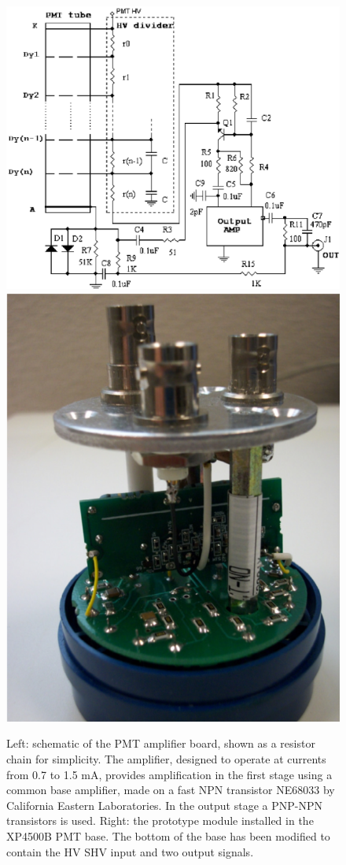 \begin{figure}
	\centering
	\includegraphics[width=1.25\columnwidth, keepaspectratio]{img/dividerSchematic.png}
	\includegraphics[width=0.75\columnwidth, height=0.95\columnwidth]{img/pmtWithDivider.png}
	\caption{Left: schematic of the PMT amplifier board, shown as a resistor chain for simplicity.
             The amplifier, designed to operate at currents from 0.7 to 1.5 mA, provides amplification in the first stage
			 using a common base amplifier, made on a fast NPN transistor NE68033 by California Eastern Laboratories.
			 In the output stage a PNP-NPN transistors is used.
             Right: the prototype module installed in the XP4500B PMT base.
             The bottom of the base has been modified to contain the HV SHV input and two output signals. }
	\label{fig:pmtWithDivider}
\end{figure}

